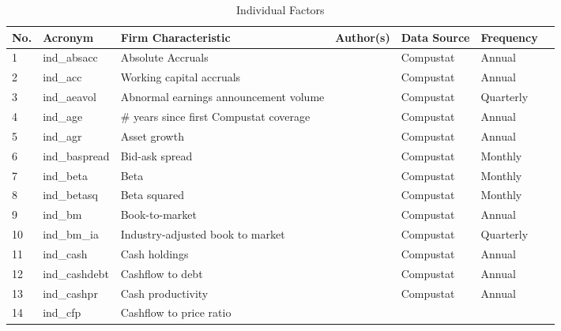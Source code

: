 \documentclass[11pt, a4paper, table]{article}
\begin{document}
\begin{landscape}
	\begin{center}
		\label{ind_factors}
		\begin{longtable}{lllllll}
			\caption{Individual Factors} \\ \hline
			No. & Acronym & Firm Characteristic & Author(s) & Data Source & Frequency \\ \hline
			1 & ind\_absacc\footnotemark[\value{footnote}] & Absolute Accruals & 
				\cite{bandyopadhyay_accrual_2010} & Compustat & Annual \\
			2 & ind\_acc\footnotemark[\value{footnote}] & Working capital accruals & 
				\cite{sloan_stock_1996} & Compustat & Annual \\
			3 & ind\_aeavol & Abnormal earnings announcement volume & 
				\cite{lerman_high-volume_2008} & Compustat & Quarterly \\
			4 & ind\_age & \# years since first Compustat coverage & 
				\cite{jiang_information_2005} & Compustat & Annual \\
			5 & ind\_agr & Asset growth & 
				\cite{cooper_asset_2008} & Compustat & Annual \\
			6 & ind\_baspread & Bid-ask spread & 
				\cite{amihud_effects_1989} & Compustat & Monthly \\
			7 & ind\_beta & Beta & 
				\cite{fama_risk_1973} & Compustat & Monthly \\
			8 & ind\_betasq & Beta squared & 
				\cite{fama_risk_1973} & Compustat & Monthly \\
			9 & ind\_bm & Book-to-market & 
				\cite{rosenberg_persuasive_1985} & Compustat & Annual \\
			10 & ind\_bm\_ia & Industry-adjusted book to market & 
				\cite{asness_predicting_2000} & Compustat & Quarterly \\
			11 & ind\_cash & Cash holdings & 
				\cite{palazzo_cash_2012} & Compustat & Annual \\
			12 & ind\_cashdebt & Cashflow to debt & 
				\cite{ou_financial_1989} & Compustat & Annual \\
			13 & ind\_cashpr & Cash productivity & 
				\cite{chandrashekar_productivity_2009} & Compustat & Annual \\
			14 & ind\_cfp\footnotemark[\value{footnote}] & Cashflow to price ratio & 

\end{longtable}
\end{center}
\end{landscape}
\end{document}
